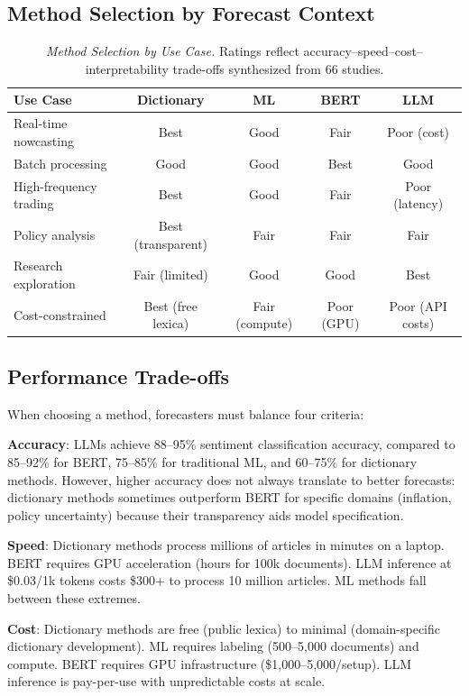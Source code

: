\documentclass[11pt]{article}
\begin{document}
\subsection{Method Selection by Forecast Context}

\begin{table}[H]
\centering \small
\begin{tabular}{|l|c|c|c|c|}
\hline
\textbf{Use Case} & \textbf{Dictionary} & \textbf{ML} & \textbf{BERT} & \textbf{LLM} \\
\hline
Real-time nowcasting & Best & Good & Fair & Poor (cost) \\
Batch processing & Good & Good & Best & Good \\
High-frequency trading & Best & Good & Fair & Poor (latency) \\
Policy analysis & Best (transparent) & Fair & Fair & Fair \\
Research exploration & Fair (limited) & Good & Good & Best \\
Cost-constrained & Best (free lexica) & Fair (compute) & Poor (GPU) & Poor (API costs) \\
\bottomrule
\end{tabular}
\caption{\textit{Method Selection by Use Case.} Ratings reflect accuracy--speed--cost--interpretability trade-offs synthesized from 66 studies.}
\label{tab:decision}
\end{table}

\subsection{Performance Trade-offs}

When choosing a method, forecasters must balance four criteria:

\noindent\textbf{Accuracy}: LLMs achieve 88--95\% sentiment classification accuracy, compared to 85--92\% for BERT, 75--85\% for traditional ML, and 60--75\% for dictionary methods. However, higher accuracy does not always translate to better forecasts: dictionary methods sometimes outperform BERT for specific domains (inflation, policy uncertainty) because their transparency aids model specification.

\noindent\textbf{Speed}: Dictionary methods process millions of articles in minutes on a laptop. BERT requires GPU acceleration (hours for 100k documents). LLM inference at \$0.03/1k tokens costs \$300+ to process 10 million articles. ML methods fall between these extremes.

\noindent\textbf{Cost}: Dictionary methods are free (public lexica) to minimal (domain-specific dictionary development). ML requires labeling (500--5,000 documents) and compute. BERT requires GPU infrastructure (\$1,000--5,000/setup). LLM inference is pay-per-use with unpredictable costs at scale.
\end{document}
